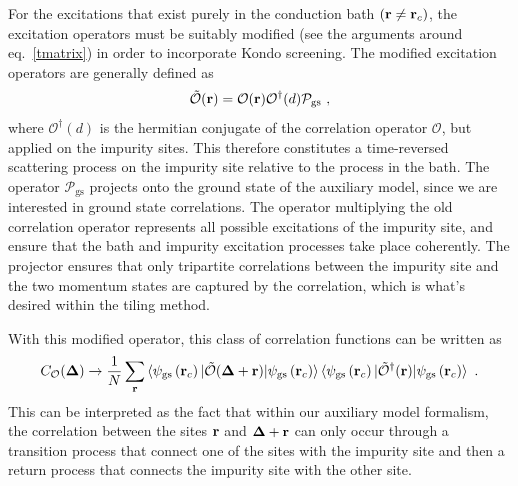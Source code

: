 \documentclass[reprint,hidelinks,onecolumn]{revtex4-2}
\begin{document}
For the excitations that exist purely in the conduction bath \(({\bf r} \neq {\bf r}_c)\), the excitation operators must be suitably modified (see the arguments around eq.~\ref{tmatrix}) in order to incorporate Kondo screening. The modified excitation operators are generally defined as
\begin{equation}\begin{aligned}\label{operatorTmatrix}
	\mathcal{\tilde O}({\bf r}) = \mathcal{O}({\bf r})\mathcal{O}^\dagger(d) \mathcal{P}_\text{gs} ~,
\end{aligned}\end{equation}
where \(\mathcal{O}^\dagger(d)\) is the hermitian conjugate of the correlation operator \(\mathcal{O}\), but applied on the impurity sites. This therefore constitutes a time-reversed scattering process on the impurity site relative to the process in the bath. The operator \(\mathcal{P}_\text{gs}\) projects onto the ground state of the auxiliary model, since we are interested in ground state correlations. The operator multiplying the old correlation operator represents all possible excitations of the impurity site, and ensure that the bath and impurity excitation processes take place coherently. The projector ensures that only tripartite correlations between the impurity site and the two momentum states are captured by the correlation, which is what's desired within the tiling method.

With this modified operator, this class of correlation functions can be written as
\begin{equation}\begin{aligned}
	C_{\mathcal{O}}({\bf \Delta}) \to \frac{1}{N}\sum_{{\bf r} }\braket{\psi_\text{gs}\left({\bf r}_c\right) | \mathcal{\tilde O}({\bf \Delta} + {\bf r}) | \psi_\text{gs}\left({\bf r}_c\right)}\braket{\psi_\text{gs}\left({\bf r}_c\right) | \mathcal{\tilde O}^\dagger({\bf r}) | \psi_\text{gs}\left({\bf r}_c\right)}~.
\end{aligned}\end{equation}
This can be interpreted as the fact that within our auxiliary model formalism, the correlation between the sites \({\bf r}\) and \({\bf \Delta + r}\) can only occur through a transition process that connect one of the sites with the impurity site and then a return process that connects the impurity site with the other site.
\end{document}
